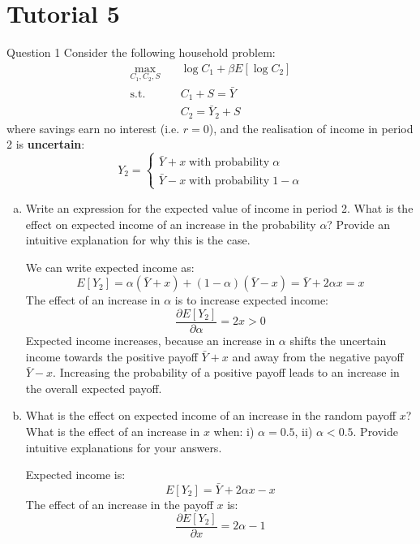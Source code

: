 \documentclass[a4paper]{article}
\newif\IfInSansMode
\begin{document}
\section{Tutorial 5}
	\begin{questionbox}{Question 1}
		Consider the following household problem:
		\begin{align*}
			\max_{C_1,C_2,S} \quad &\log C_1 + \beta E[\log C_2]\\
			\text{s.t.} \quad &C_1 + S =\bar{Y}\\
			&C_2 = \bar{Y}_2 + S
		\end{align*}
		where savings earn no interest (i.e. \( r = 0 \)), and the realisation of income in period 2 is \textbf{uncertain}:
		\[
			Y_2 =
			\begin{cases}
				\bar{Y} + x \;\text{with probability}\; \alpha\\
				\bar{Y} - x \;\text{with probability}\; 1 - \alpha
			\end{cases}
		\]
		\begin{enumerate}[(a)]
			\item Write an expression for the expected value of income in period 2. What is the eﬀect on expected income of an increase in the probability \( \alpha \)? Provide an intuitive explanation for why this is the case.
			\begin{explanationbox}
				We can write expected income as:
				\[
					E[Y_2] = \alpha(\bar{Y} + x) + (1 - \alpha)(\bar{Y} - x) = \bar{Y} + 2\alpha x = x
				\]
				The eﬀect of an increase in \( \alpha \) is to increase expected income:
				\[
					\frac{\partial E[Y_2]}{\partial \alpha} = 2x > 0
				\]
				Expected income increases, because an increase in \( \alpha \) shifts the uncertain income towards the positive payoff \( \bar{Y} + x \) and away from the negative payoﬀ \( \bar{Y} - x \). Increasing the probability of a positive payoﬀ leads to an increase in the overall expected payoﬀ.
			\end{explanationbox}
			\item What is the effect on expected income of an increase in the random payoﬀ \( x \)? What is the eﬀect of an increase in \( x \) when: i) \( \alpha = 0.5 \), ii) \( \alpha < 0.5 \). Provide intuitive explanations for your answers.
			\begin{explanationbox}
				Expected income is:
				\[
					E[Y_2] = \bar{Y} + 2\alpha x - x
				\]
				The eﬀect of an increase in the payoff \( x \) is:
				\[
					\frac{\partial E[Y_2]}{\partial x} = 2\alpha - 1
				\]
				\begin{enumerate}[(i)]

\end{enumerate}
\end{explanationbox}
\end{enumerate}
\end{questionbox}
\end{document}
